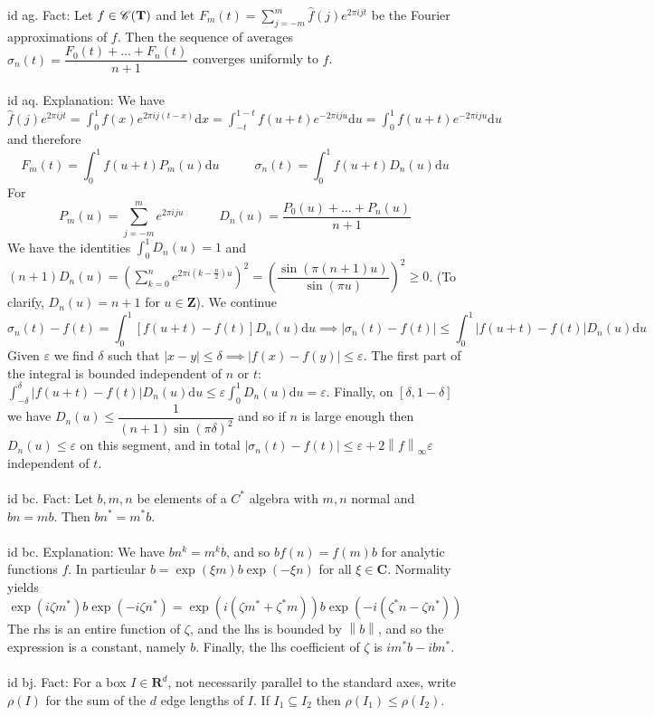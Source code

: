 \documentclass[oneside]{book}
\newcommand{\sub}{\subseteq}
\newcommand{\eps}{\varepsilon}
\newcommand{\Z}{\mathbf{Z}}
\newcommand{\R}{\mathbf{R}}
\newcommand{\C}{\mathbf{C}}
\newcommand{\T}{\mathbf{T}}
\newcommand{\fit}[1]{\left( #1\right)}
\newcommand{\abs}[1]{\left\lvert #1\right\rvert}
\newcommand{\norm}[1]{\left\lVert #1\right\rVert}
\renewcommand{\d}{\mathrm{d}}
\newcommand{\str}{^*}
\begin{document}
id ag. Fact: Let $f\in\CC(\T)$ and let $F_m(t)=\displaystyle\sum_{j=-m}^m \hat{f}(j) e^{2\pi i jt}$ be the Fourier approximations of $f$. Then the sequence of averages $\sigma_n(t)=\dfrac{F_0(t)+\dots +F_n(t)}{n+1}$ converges uniformly to $f$. \\\\


id aq. Explanation: We have
$\hat{f}(j)e^{2\pi ijt}=\int_0^1 f(x)e^{2\pi i j(t-x)}\d x=\int_{-t}^{1-t}f(u+t)e^{-2\pi i j u}\d u=\int_{0}^{1}f(u+t)e^{-2\pi i j u}\d u$
and therefore 
$$F_m(t)=\int_0^1 f(u+t) P_m(u)\d u \phantom{---} \sigma_n(t)=\int_0^1 f(u+t) D_n(u)\d u $$
For
$$P_m(u)=\sum_{j=-m}^m e^{2\pi i j u} \phantom{---} D_n(u)=\dfrac{P_0(u)+\dots+P_n(u)}{n+1}$$
We have the identities $\displaystyle \int_0^1 D_n(u)=1$ and
$\displaystyle (n+1)D_n(u)=\fit{\sum_{k=0}^n e^{2\pi i(k-\frac{n}{2})u}}^2=\fit{\dfrac{\sin(\pi(n+1)u)}{\sin(\pi u)}}^2\ge0$. (To clarify, $D_n(u)=n+1$ for $u\in\Z$).
We continue
$$\sigma_n(t)-f(t)=\int_0^1  [f(u+t)-f(t)] D_n(u)\d u\implies \abs{\sigma_n(t)-f(t)}\le\int_0^1  \abs{f(u+t)-f(t)} D_n(u)\d u $$
Given $\eps$ we find $\delta$ such that
$\abs{x-y}\le\delta\implies\abs{f(x)-f(y)}\le\eps$.
The first part of the integral is bounded independent of $n$ or $t$: $ \int_{-\delta}^{\delta}  \abs{f(u+t)-f(t)} D_n(u)\d u\le \eps  \int_{0}^{1} D_n(u)\d u=\eps$. Finally, on $[\delta,1-\delta]$ we have $D_n(u)\le \dfrac{1}{(n+1)\sin(\pi\delta)^2}$
and so if $n$ is large enough then $D_n(u)\le \eps$ on this segment, and in total 
$\abs{\sigma_n(t)-f(t)}\le \eps+2\norm{f}_\infty\eps$
independent of $t$.     \\\\


id bc. Fact: Let $b,m,n$ be elements of a $C\str$ algebra with $m,n$ normal and $bn=mb$. Then $bn\str=m\str b$. \\\\


id bc. Explanation: We have $bn^k=m^kb$, and so $bf(n)=f(m)b$ for analytic functions $f$. In particular $b=\exp(\xi m)b\exp(-\xi n)$ for all $\xi\in\C$. Normality yields
$$\exp(i\zeta m\str)b\exp(-i\zeta n\str) = \exp(i(\zeta m\str + \zeta\str m))b\exp(-i(\zeta^* n-\zeta n\str))$$
The rhs is an entire function of $\zeta$, and the lhs is bounded by $\norm{b}$, and so the expression is a constant, namely $b$. Finally, the lhs coefficient of $\zeta$ is $im\str b-ibn\str$. \\\\


id bj. Fact: For a box $I\in\R^d$, not necessarily parallel to the standard axes, write $\rho(I)$ for the sum of the $d$ edge lengths of $I$. If $I_1\sub I_2$ then $\rho(I_1)\le \rho(I_2)$.   \\\\
\end{document}
